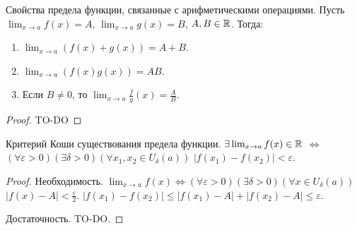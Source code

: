 \begin{theorem}{Свойства предела функции, связанные с арифметическими операциями.}
	Пусть $\lim_{x \to a} f(x) = A$, $\lim_{x \to a} g(x) = B$, $A, B \in \mathbb{R}$. Тогда:
	\begin{enumerate}
		\item $\lim_{x \to a} (f(x) + g(x)) = A + B$.
		\item $\lim_{x \to a} (f(x)g(x)) = AB$.
		\item Если $B \neq 0$, то $\lim_{x \to a} \frac{f}{g}(x) = \frac{A}{B}$.
	\end{enumerate} 
\end{theorem}
\begin{proof}
	TO-DO
\end{proof}

\begin{theorem}{Критерий Коши существования предела функции.}
	$\exists \lim_{x \to a} f(x) \in \mathbb{R}$ $\Leftrightarrow$ $(\forall \varepsilon > 0) (\exists \delta > 0) (\forall x_1, x_2 \in U_\delta(a))$ $|f(x_1) - f(x_2)| < \varepsilon$.
\end{theorem}
\begin{proof}
	Необходимость. $\lim_{x \to a} f(x) \Leftrightarrow (\forall \varepsilon > 0) (\exists \delta > 0) (\forall x \in U_\delta(a))$ $|f(x) - A| < \frac{\varepsilon}{2}$. $|f(x_1) - f(x_2)| \le |f(x_1) - A| + |f(x_2) - A| \le \varepsilon$.
	
	Достаточность. TO-DO.
\end{proof}